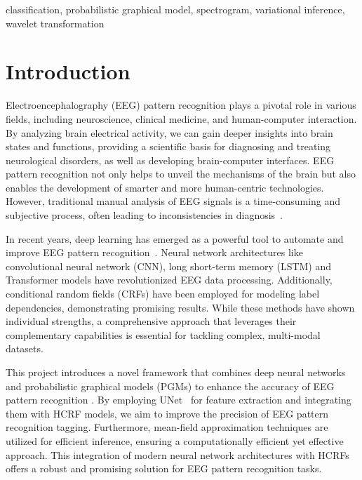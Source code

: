 \documentclass[conference]{IEEEtran}
\begin{document}
\begin{IEEEkeywords}


classification, probabilistic graphical model, spectrogram,
variational inference, wavelet transformation


\end{IEEEkeywords}


\section{Introduction}


Electroencephalography (EEG) pattern recognition plays a pivotal role in
various fields, including neuroscience, clinical medicine, and human-computer
interaction. By analyzing brain electrical activity, we can gain deeper
insights into brain states and functions, providing a scientific basis for
diagnosing and treating neurological disorders, as well as developing
brain-computer interfaces. EEG pattern recognition not only helps to unveil the
mechanisms of the brain but also enables the development of smarter and more
human-centric technologies. However, traditional manual analysis of EEG signals
is a time-consuming and subjective process, often leading to inconsistencies in
diagnosis~\citep{liu2013recognizing}.


In recent years, deep learning has emerged as a powerful tool to automate and
improve EEG pattern recognition~\citep{craik2019deep}. Neural network
architectures like convolutional neural network (CNN), long short-term memory
(LSTM) and Transformer models have revolutionized EEG data processing.
Additionally, conditional random fields (CRFs) have been employed for
modeling label dependencies, demonstrating promising results.
While these methods have shown individual strengths, a comprehensive
approach that leverages their complementary capabilities is essential for
tackling complex, multi-modal datasets.


This project introduces a novel framework that combines deep neural networks
and probabilistic graphical models (PGMs) to enhance the accuracy of EEG
pattern recognition . By employing UNet~\citep{ronneberger2015unet} for feature
extraction and integrating them with HCRF models, we aim to improve the
precision of EEG pattern recognition tagging. Furthermore, mean-field
approximation techniques are utilized for efficient inference, ensuring a
computationally efficient yet effective approach.
This integration of modern neural network architectures with HCRFs offers
a robust and promising solution for EEG pattern recognition tasks.
\end{document}

